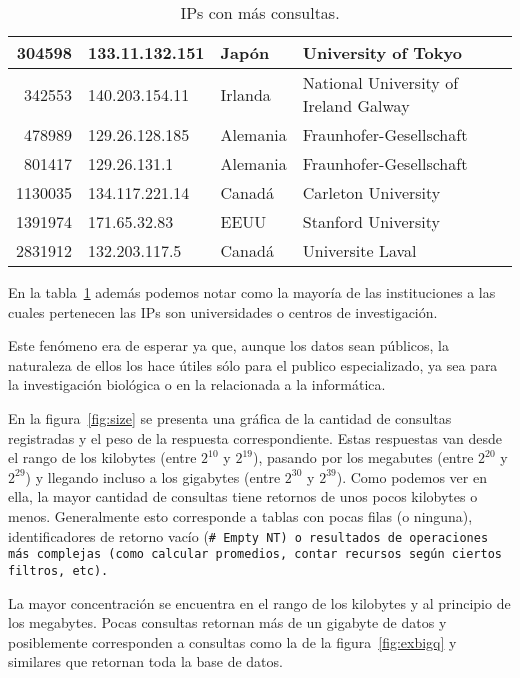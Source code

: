 \begin{table}[ht]
\begin{tabular}{|r|l|l|l|}
    304598  & 133.11.132.151  & Japón          
                   & University of Tokyo\\\hline
    342553  & 140.203.154.11  & Irlanda        
                   & National University of Ireland Galway\\\hline
    478989  & 129.26.128.185  & Alemania       
                   & Fraunhofer-Gesellschaft\\\hline
    801417  & 129.26.131.1    & Alemania       
                   & Fraunhofer-Gesellschaft\\\hline
    1130035 & 134.117.221.14  & Canadá         
                   & Carleton University\\\hline
    1391974 & 171.65.32.83    & EEUU 
                   & Stanford University\\\hline
    2831912 & 132.203.117.5   & Canadá         
                   & Universite Laval\\\hline
  \end{tabular}
  \caption{IPs con más consultas.}\label{tab:ips}
\end{table}

En la tabla~\ref{tab:ips} además podemos notar como la mayoría de las
instituciones a las cuales pertenecen las IPs son universidades o centros de
investigación.

Este fenómeno era de esperar ya que, aunque los datos sean públicos, la
naturaleza de ellos los hace útiles sólo para el publico especializado, ya sea
para la investigación biológica o en la relacionada a la informática.

En la figura~\ref{fig:size} se presenta una gráfica de la cantidad de consultas
registradas y el peso de la respuesta correspondiente. Estas respuestas van
desde el rango de los kilobytes (entre $2^{10}$ y $2^{19}$), pasando por los
megabutes (entre $2^{20}$ y $2^{29}$) y llegando incluso a los gigabytes (entre
$2^{30}$ y  $2^{39}$).
Como podemos ver en ella, la mayor cantidad de consultas tiene retornos de unos
pocos kilobytes o menos.
Generalmente esto corresponde a tablas con pocas filas (o ninguna),
identificadores de retorno vacío (\tt{\# Empty NT}) o resultados de operaciones
más complejas (como calcular promedios, contar recursos según ciertos filtros,
etc).

La mayor concentración se encuentra en el rango de los kilobytes y al principio
de los megabytes.
Pocas consultas retornan más de un gigabyte de datos y posiblemente
corresponden a consultas como la de la figura~\ref{fig:exbigq} y similares que
retornan toda la base de datos.

